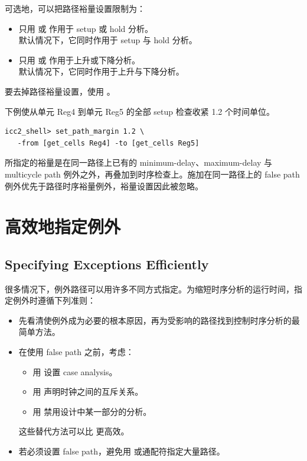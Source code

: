 可选地，可以把路径裕量设置限制为：
\begin{itemize}
  \item 只用  或  作用于 setup 或 hold 分析。\\
        默认情况下，它同时作用于 setup 与 hold 分析。
  \item 只用  或  作用于上升或下降分析。\\
        默认情况下，它同时作用于上升与下降分析。
\end{itemize}

要去掉路径裕量设置，使用  。

下例使从单元 Reg4 到单元 Reg5 的全部 setup 检查收紧 1.2 个时间单位。
\begin{lstlisting}
icc2_shell> set_path_margin 1.2 \
   -from [get_cells Reg4] -to [get_cells Reg5]
\end{lstlisting}

所指定的裕量是在同一路径上已有的 minimum-delay、maximum-delay 与 multicycle path 例外之外，再叠加到时序检查上。施加在同一路径上的 false path 例外优先于路径时序裕量例外，裕量设置因此被忽略。

\section{高效地指定例外}
\subsection*{Specifying Exceptions Efficiently}

很多情况下，例外路径可以用许多不同方式指定。为缩短时序分析的运行时间，指定例外时遵循下列准则：
\begin{itemize}
  \item 先看清使例外成为必要的根本原因，再为受影响的路径找到控制时序分析的最简单方法。
  \item 在使用 false path 之前，考虑：
        \begin{itemize}
          \item 用  设置 case analysis。
          \item 用  声明时钟之间的互斥关系。
          \item 用  禁用设计中某一部分的分析。
        \end{itemize}
        这些替代方法可以比  更高效。
  \item 若必须设置 false path，避免用  或通配符指定大量路径。
\end{itemize}

